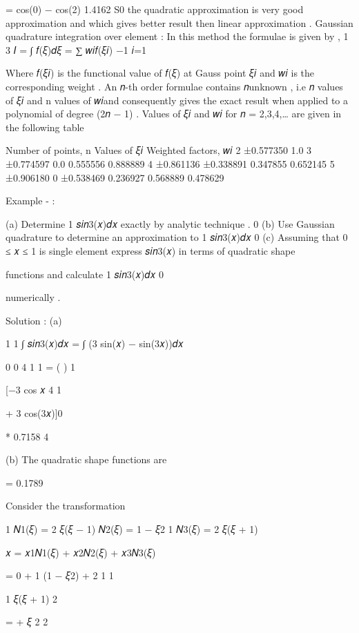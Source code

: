 {{{{{{= cos(0) − cos(2) 1.4162
S0 the quadratic approximation is very good approximation and which gives better result then linear approximation .
Gaussian quadrature integration over element :
In this method the formulae is given by ,
1	3
𝐼 = ∫ 𝑓(𝜉)𝑑𝜉 = ∑ 𝑤𝑖𝑓(𝜉𝑖)
−1	𝑖=1


Where 𝑓(𝜉𝑖) is the functional value of 𝑓(𝜉) at Gauss point 𝜉𝑖 and 𝑤𝑖 is the corresponding weight
.
An 𝑛-th order formulae contains 𝑛unknown , i.e 𝑛 values of 𝜉𝑖 and n values of 𝑤𝑖and consequently gives the exact result when applied to a polynomial of degree (2𝑛 − 1) .
Values of 𝜉𝑖 and 𝑤𝑖 for 𝑛 = 2,3,4,…	are given in the following table



Number of points, n	Values of 𝜉𝑖	Weighted factors, 𝑤𝑖
2	±0.577350	1.0
3	±0.774597
0.0	0.555556
0.888889
4	±0.861136
±0.338891	0.347855
0.652145
5	±0.906180
0
±0.538469	0.236927
0.568889
0.478629

Example - :

(a)	Determine	1 𝑠𝑖𝑛3(𝑥)𝑑𝑥 exactly by analytic technique .
0
(b)	Use Gaussian quadrature to determine an approximation to	1 𝑠𝑖𝑛3(𝑥)𝑑𝑥
0
(c)	Assuming that 0 ≤ 𝑥 ≤ 1 is single element express 𝑠𝑖𝑛3(𝑥) in terms of quadratic shape
 
functions and calculate	1 𝑠𝑖𝑛3(𝑥)𝑑𝑥
0
 
numerically .
 
Solution :  (a)
 


1	1
∫ 𝑠𝑖𝑛3(𝑥)𝑑𝑥 = ∫   (3 sin(𝑥) − sin(3𝑥))𝑑𝑥
 
0	0 4
1	1
=  	( )	 	1
 
[−3 cos 𝑥
4
1
 
+ 3 cos(3𝑥)]0
 
  * 0.7158
4

 


(b) The quadratic shape functions are
 
= 0.1789
 

 







Consider the transformation
 
1
𝑁1(𝜉) = 2 𝜉(𝜉 − 1)
𝑁2(𝜉) = 1 − 𝜉2
1
𝑁3(𝜉) = 2 𝜉(𝜉 + 1)
 
𝑥 = 𝑥1𝑁1(𝜉) + 𝑥2𝑁2(𝜉) + 𝑥3𝑁3(𝜉)

 
= 0 + 1 (1 − 𝜉2) +
2
1	1
 
1
  𝜉(𝜉 + 1)
2
 
=   +   𝜉
2	2
 


}}}}}}
